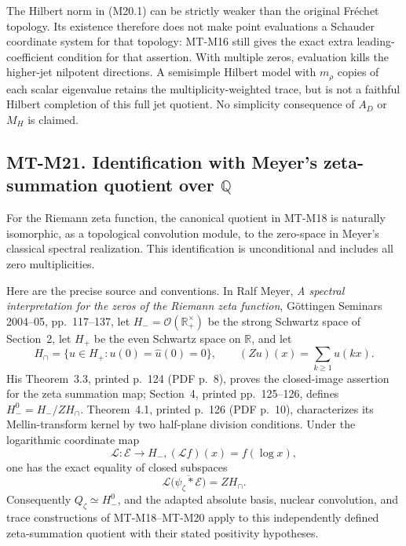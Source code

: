 The Hilbert norm in (M20.1) can be strictly weaker than
the original Fr\'echet topology. Its existence therefore
does not make point evaluations a Schauder coordinate
system for that topology: MT-M16 still gives the exact
extra leading-coefficient condition for that assertion.
With multiple zeros, evaluation kills the higher-jet
nilpotent directions. A semisimple Hilbert model with
\(m_\rho\) copies of each scalar eigenvalue retains
the multiplicity-weighted trace, but is not a faithful
Hilbert completion of this full jet quotient. No
simplicity consequence of \(A_D\) or \(M_H\) is claimed.


\subsection*{MT-M21. Identification with Meyer's zeta-summation quotient over \(\mathbb Q\)}
For the Riemann zeta function, the canonical quotient in MT-M18
is naturally isomorphic, as a topological convolution module,
to the zero-space in Meyer's classical spectral realization.
This identification is unconditional and includes all zero
multiplicities.

Here are the precise source and conventions. In Ralf Meyer,
\emph{A spectral interpretation for the zeros of the Riemann
zeta function}, G\"ottingen Seminars 2004--05, pp.~117--137,
let \(H_- =\mathcal O(\mathbb R_+^\times)\) be the strong
Schwartz space of Section~2, let \(H_+\) be the even Schwartz
space on \(\mathbb R\), and let
\[
 H_\cap=\{u\in H_+:u(0)=\widehat u(0)=0\},\qquad
 (Zu)(x)=\sum_{k\ge1}u(kx).
\]
His Theorem~3.3, printed p.~124 (PDF p.~8), proves the
closed-image assertion for the zeta summation map; Section~4,
printed pp.~125--126, defines
\(H_-^0=H_-/ZH_\cap\).
Theorem~4.1, printed p.~126 (PDF p.~10), characterizes its
Mellin-transform kernel by two half-plane division conditions.
Under the logarithmic coordinate map
\[
       \mathcal L:\mathcal E\longrightarrow H_-,
       (\mathcal Lf)(x)=f(\log x),
\]
one has the exact equality of closed subspaces
\[
          \mathcal L\bigl(\overline{\psi_\zeta*\mathcal E}\bigr)
                         = ZH_\cap.                  \tag{M21.1}
\]
Consequently \(Q_\zeta\simeq H_-^0\), and the adapted
absolute basis, nuclear convolution, and trace constructions
of MT-M18--MT-M20 apply to this independently defined
zeta-summation quotient with their stated positivity hypotheses.


